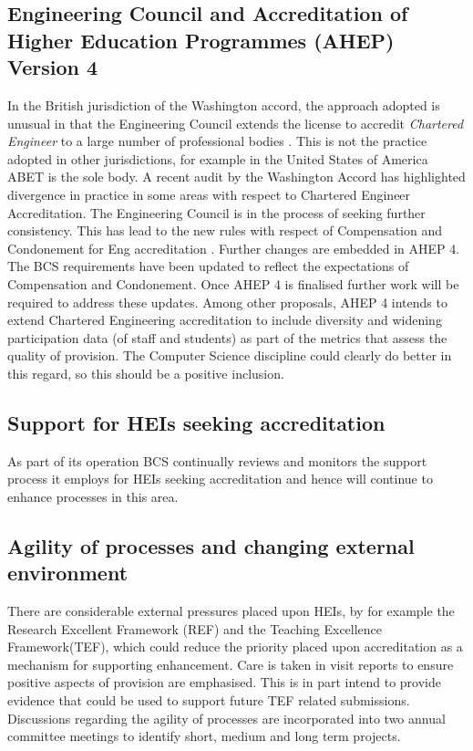 \documentclass[sigconf]{acmart}
\begin{document}
\subsection {Engineering Council and Accreditation of Higher Education Programmes (AHEP) Version 4}
In the British jurisdiction of the Washington accord, the approach adopted is unusual in that the Engineering Council extends the license to accredit \emph{Chartered Engineer} to a large number of professional bodies \cite{EC2019}. This is not the practice adopted in other jurisdictions, for example in the United States of America ABET is the sole body. A recent audit by the Washington Accord has highlighted divergence in practice in some areas with respect to Chartered Engineer Accreditation. The Engineering Council is in the process of seeking further consistency. This has lead to the new rules with respect of Compensation and Condonement for Eng accreditation \cite{EC2018}. Further changes are embedded in AHEP 4. The BCS requirements have been updated to reflect the expectations of Compensation and Condonement. Once AHEP 4 is finalised further work will be required to address these updates. Among other proposals, AHEP 4 intends to extend Chartered Engineering accreditation to include diversity and widening participation data (of staff and students) as part of the metrics that assess the quality of provision. The Computer Science discipline could clearly do better in this regard, so this should be a positive inclusion.

\subsection{Support for HEIs seeking accreditation}
As part of its operation BCS continually reviews and monitors the support process it employs for HEIs seeking accreditation and hence will continue to enhance processes in this area.

\subsection{Agility of processes and changing external environment}
There are considerable external pressures placed upon HEIs, by for example the Research Excellent Framework (REF) and the Teaching Excellence Framework(TEF), which could reduce the priority placed upon accreditation as a mechanism for supporting enhancement. Care is taken in visit reports to ensure positive aspects of provision are emphasised. This is in part intend to provide evidence that could be used to support future TEF related submissions. Discussions regarding the agility of processes are incorporated into two annual committee meetings to identify short, medium and long term projects. 
\end{document}
